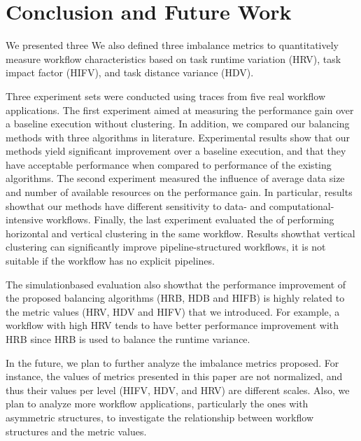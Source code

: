 \section{Conclusion and Future Work}

We presented three We also defined three imbalance metrics to quantitatively measure workflow characteristics based on task runtime variation (HRV), task impact factor (HIFV), and task distance variance (HDV).

Three experiment sets were conducted using traces from five real workflow applications. The first experiment aimed at measuring the performance gain over a baseline execution without clustering. In addition, we compared our balancing methods with three algorithms in literature. Experimental results show that our methods yield significant improvement over a baseline execution, and that they have acceptable performance when compared to performance of the existing algorithms. The second experiment measured the influence of average data size and number of available resources on the performance gain. In particular, results showthat our methods have different sensitivity to data- and computational-intensive workflows. Finally, the last experiment evaluated the of performing horizontal and vertical clustering in the same workflow. Results showthat vertical clustering can significantly improve pipeline-structured workflows, it is not suitable if the workflow has no explicit pipelines.

The simulation\rev{-}based evaluation also showthat the performance improvement of the proposed balancing algorithms (HRB, HDB and HIFB) is highly related to the metric values (HRV, HDV and HIFV) that we introduced. For example, a workflow with high HRV tends to have better performance improvement with HRB since HRB is used to balance the runtime variance. 

In the future, we plan to further analyze the imbalance metrics proposed. For instance, the values of metrics presented in this paper are not normalized, and thus their values per level (HIFV, HDV, and HRV) are different scales. Also, we plan to analyze more workflow applications, particularly the ones with asymmetric structures, to investigate the relationship between workflow structures and the metric values. 


